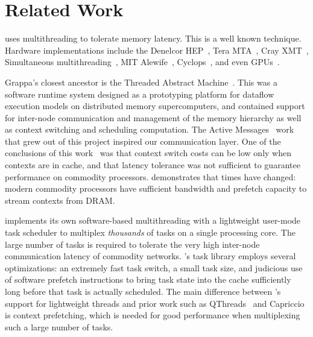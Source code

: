 \section{Related Work}

\vspace{0.5ex}
\Grappa uses multithreading to tolerate memory
latency. This is a well known technique. Hardware implementations include the
Denelcor HEP~\cite{hep}, Tera MTA~\cite{tera:mta1}, Cray XMT~\cite{feo:xmt}, Simultaneous
multithreading~\cite{tullsen:smt}, MIT Alewife~\cite{agarwal:alewife},
Cyclops~\cite{almasi:cyclops}, and even GPUs~\cite{gpus}.

Grappa's closest ancestor is the Threaded Abstract
Machine~\cite{CullerGSvE93}. This was a software runtime system
designed as a prototyping platform for dataflow execution models on
distributed memory supercomputers, and contained support for
inter-node communication and management of the memory hierarchy as
well as context switching and scheduling computation. The Active
Messages~\cite{vonEicken:1992:AMM:139669.140382} work that grew out of
this project inspired our communication layer. One of the conclusions
of this work~\cite{Culler:1993:TFL:647025.714362} was that context
switch costs can be low only when contexts are in cache, and that
latency tolerance was not sufficient to guarantee performance on
commodity processors. \Grappa demonstrates that times have changed:
modern commodity processors have sufficient bandwidth and prefetch
capacity to stream contexts from DRAM.


\Grappa implements its own software-based multithreading with a
lightweight user-mode task scheduler to multiplex \emph{thousands\/} of tasks
on a single processing core. The large number of tasks is required to tolerate
the very high inter-node communication latency of commodity networks.
\Grappa's task library employs several optimizations: an extremely fast task
switch, a small task size, and judicious use of software prefetch instructions
to bring task state into the cache sufficiently long before that task is
actually scheduled. The main difference between \Grappa's support for
lightweight threads and prior work such as
QThreads~\cite{Wheeler08qthreads:an} and
Capriccio~\cite{Behren03capriccio:scalable} is context prefetching, which is needed for good performance when multiplexing such a large
number of tasks.

